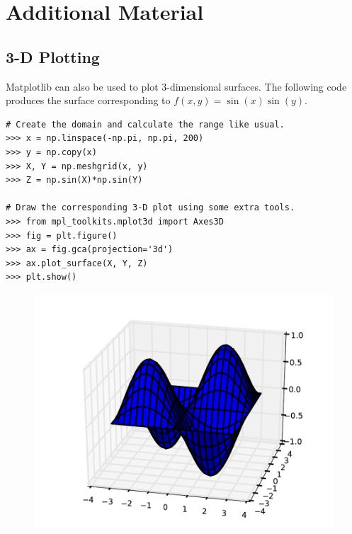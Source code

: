 \newpage

\section*{Additional Material} %

\subsection*{3-D Plotting} %

Matplotlib can also be used to plot 3-dimensional surfaces.
The following code produces the surface corresponding to $f(x,y) = \sin(x)\sin(y)$.

\begin{lstlisting}
# Create the domain and calculate the range like usual.
>>> x = np.linspace(-np.pi, np.pi, 200)
>>> y = np.copy(x)
>>> X, Y = np.meshgrid(x, y)
>>> Z = np.sin(X)*np.sin(Y)

# Draw the corresponding 3-D plot using some extra tools.
>>> from mpl_toolkits.mplot3d import Axes3D
>>> fig = plt.figure()
>>> ax = fig.gca(projection='3d')
>>> ax.plot_surface(X, Y, Z)
>>> plt.show()
\end{lstlisting}

\begin{figure}[H]
    \includegraphics[width=.7\textwidth]{figures/surface_plot.pdf}
\end{figure}


